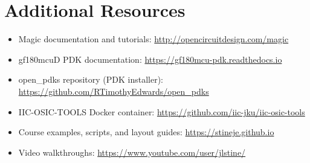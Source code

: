\documentclass[11pt]{article}
\begin{document}
\section*{Additional Resources}

\begin{itemize}[leftmargin=2em]
  \item Magic documentation and tutorials:
        \url{http://opencircuitdesign.com/magic}
  \item gf180mcuD PDK documentation:
        \url{https://gf180mcu-pdk.readthedocs.io}
  \item open\_pdks repository (PDK installer):
        \url{https://github.com/RTimothyEdwards/open_pdks}
  \item IIC-OSIC-TOOLS Docker container:
        \url{https://github.com/iic-jku/iic-osic-tools}
  \item Course examples, scripts, and layout guides:
        \url{https://stineje.github.io}
  \item Video walkthroughs:
        \url{https://www.youtube.com/user/jlstine/}
\end{itemize}
\end{document}
